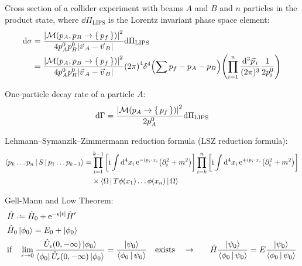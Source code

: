 		\noindent
		Cross section of a collider experiment with beams $A$ and $B$ and $n$ particles in the product state, where $\dd \Pi_\mathrm{LIPS}$ is the Lorentz invariant phase space element:
		\begin{equation}
			\begin{aligned}
				\dd \sigma
				&= \frac{\abs{\mathcal{M}(p_A,p_B \to\set{p_f})}^2}{4p_A^0 p_B^0 \abs{\vec{v}_A - \vec{v}_B}} \dd \Pi_\mathrm{LIPS} \\
				&= \frac{\abs{\mathcal{M}(p_A,p_B \to\set{p_f})}^2}{4p_A^0 p_B^0 \abs{\vec{v}_A - \vec{v}_B}}  \qty(2\pi)^4 \delta^4 \qty(\sum p_{f} - p_A - p_B) \qty(\prod_{i=1}^{n} \frac{\dd[3] \vec{p}_i}{(2 \pi)^3} \frac{1}{2 p_i^0})
			\end{aligned}
		\end{equation}

		\noindent
		One-particle decay rate of a particle $A$:
		\begin{equation}
			\dd \Gamma = \frac{\abs{\mathcal{M}(p_A \to\set{p_f})}^2}{2 p_A^0} \dd \Pi_\mathrm{LIPS}
		\end{equation}

		\noindent
		Lehmann--Symanzik--Zimmermann reduction formula (LSZ reduction formula):
		\begin{equation}
			\begin{aligned}
				\Braket{p_k \hdots p_n|S|p_1 \hdots p_{k-1}} = &\prod_{i=1}^{k-1} \qty[\mathrm{i} \int \dd[4]{x_i} \mathrm{e}^{-\mathrm{i} p_i\cdot x_i} \qty(\partial^2_i+m^2)] \prod_{i=k}^{n} \qty[\mathrm{i} \int \dd[4]{x_i} \mathrm{e}^{+\mathrm{i} p_i\cdot x_i} \qty(\partial^2_i+m^2)] \\
				&\times\Braket{\Omega|T \phi(x_1) \hdots \phi(x_n)|\Omega}
			\end{aligned}
		\end{equation}

		\noindent
		Gell-Mann and Low Theorem:
		\begin{equation}
			\begin{aligned}
				&\hat{H} \defeq \hat{H}_0 + \ex^{-\epsilon \abs{t}} \hat{H}' \\
				&\hat{H}_0 \Ket{\phi_0} = E_0 + \Ket{\phi_0} \\
				&\text{if}\quad \lim_{\epsilon\to 0} \frac{\hat{U}_\epsilon(0,-\infty)\Ket{\phi_0}}{\Bra{\phi_0} \hat{U}_\epsilon(0,-\infty)\Ket{\phi_0}}
				= \frac{\Ket{\psi_0}}{\Braket{\phi_0|\psi_0}} \quad\text{exists}\quad
				\to&\quad \hat{H} \frac{\Ket{\psi_0}}{\Braket{\phi_0|\psi_0}} = E \frac{\Ket{\psi_0}}{\Braket{\phi_0|\psi_0}} \\
			\end{aligned}
		\end{equation}

